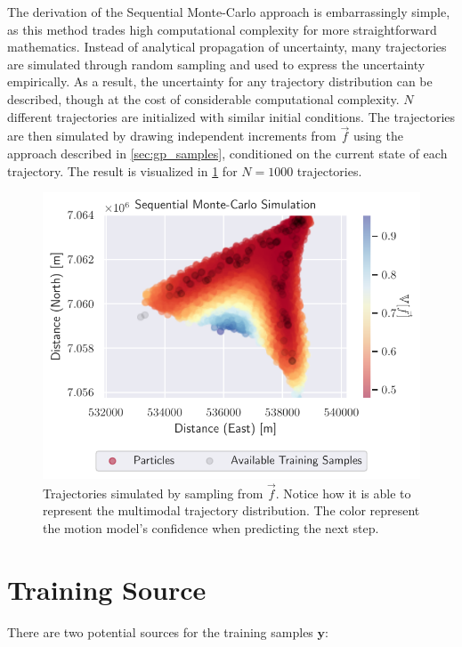 The derivation of the Sequential Monte-Carlo approach is embarrassingly simple, as this method trades high computational complexity for more straightforward mathematics. Instead of analytical propagation of uncertainty, many trajectories are simulated through random sampling and used to express the uncertainty empirically. As a result, the uncertainty for any trajectory distribution can be described, though at the cost of considerable computational complexity.
$N$ different trajectories are initialized with similar initial conditions. The trajectories are then simulated by drawing independent increments from $\vec{f}$ using the approach described in \cref{sec:gp_samples}, conditioned on the current state of each trajectory. The result is visualized in \cref{fig:gp_particle} for $N=1000$ trajectories.
\begin{figure}[h]
    \centering
    \includegraphics[width=\textwidth]{figures/dyngp/gp_particle.pdf}
    \caption{Trajectories simulated by sampling from $\vec{f}$. Notice how it is able to represent the multimodal trajectory distribution. The color represent the motion model's confidence when predicting the next step. }
    \label{fig:gp_particle}
\end{figure}

\section{Training Source}
There are two potential sources for the training samples $\boldsymbol{y}$:

